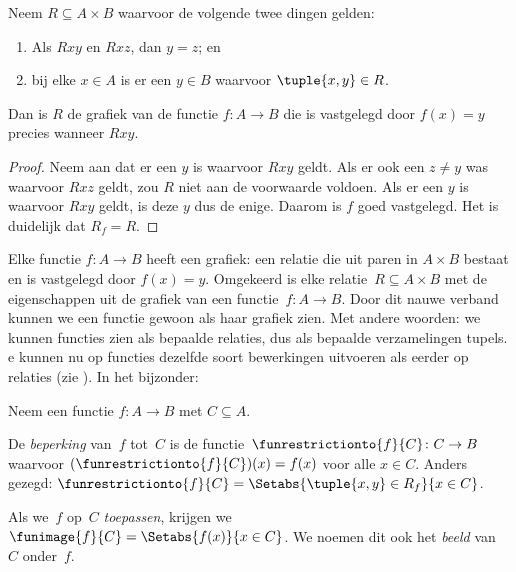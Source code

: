\documentclass[openany]{memoir}
\begin{document}
\begin{prop}
Neem $R \subseteq A \times B$ waarvoor de volgende twee dingen gelden:
\begin{enumerate}
\item Als $Rxy$ en $Rxz$, dan $y = z$; en
\item bij elke $x \in A$ is er een $y \in B$ waarvoor $\tuple{x,
y} \in R$.
\end{enumerate}
Dan is $R$ de grafiek van de functie $f\colon A \to B$ die is
vastgelegd door $f(x) = y$ precies wanneer $Rxy$.
\end{prop}

\begin{proof}
Neem aan dat er een $y$ is waarvoor $Rxy$ geldt. Als er ook een $z
\neq y$ was waarvoor $Rxz$ geldt, zou $R$ niet aan de voorwaarde
voldoen. Als er een $y$ is waarvoor $Rxy$ geldt, is deze $y$ dus de
enige. Daarom is $f$ goed vastgelegd. Het is duidelijk dat $R_f = R$.
\end{proof}

\begin{explain}
Elke functie $f\colon A \to B$ heeft een grafiek: een relatie die uit
paren in $A \times B$ bestaat en is vastgelegd door $f(x) = y$.
Omgekeerd is elke
relatie~$R \subseteq A \times B$ met de eigenschappen uit
 de grafiek van een functie~$f \colon A \to
B$. Door dit nauwe verband kunnen we een functie gewoon als haar
grafiek zien. Met andere woorden: we kunnen functies zien als bepaalde
relaties, dus als bepaalde verzamelingen tupels.
e kunnen nu op functies
dezelfde soort bewerkingen uitvoeren als eerder op relaties (zie
). In het bijzonder:
\end{explain}

\begin{defn}
Neem een functie $f \colon A \to B$ met $C\subseteq A$.

De \emph{beperking} van~$f$ tot~$C$ is de
functie~$\funrestrictionto{f}{C}\colon C \to B$ waarvoor
$(\funrestrictionto{f}{C})(x) = f(x)$ voor alle $x \in C$. Anders
gezegd: $\funrestrictionto{f}{C} = \Setabs{\tuple{x, y} \in R_f}{x
\in C}$.

Als we~$f$ op~$C$ \emph{toepassen}, krijgen we $\funimage{f}{C} =
\Setabs{f(x)}{x \in C}$. We noemen dit ook het \emph{beeld} van~$C$
onder~$f$.
\end{defn}
\end{document}
